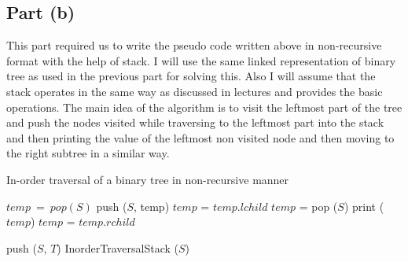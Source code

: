 \documentclass{article}
\begin{document}
{    \subsection {Part (b)} {
        This part required us to write the pseudo code written above in non-recursive format with the help of stack. I will use the same linked representation of binary tree as used in the previous part for solving this. Also I will assume that the stack operates in the same way as discussed in lectures and provides the basic operations. The main idea of the algorithm is to visit the leftmost part of the tree and push the nodes visited while traversing to the leftmost part into the stack and then printing the value of the leftmost non visited node and then moving to the right subtree in a similar way. \newline \\
        \colorbox[gray]{0.95} {  
        \begin{algorithm2e}[H]
        \caption{In-order traversal of a binary tree in non-recursive manner}
        \DontPrintSemicolon
          
          
          \vspace{5pt}
           {
            $temp\ =\ pop (S)$\;
            {   
                {
                    push ($S$, temp)\;
                    $temp$ = $temp.lchild$\;
                }
                $temp$ = pop ($S$)\;
                print ($temp$)\;
                $temp$ = $temp.rchild$\;
            }
            \KwRet
          }
          
             {
                push ($S$, $T$)\;
                InorderTraversalStack ($S$)\;
                \KwRet
            }
         \end{algorithm2e}
         }
    }
}
\end{document}
